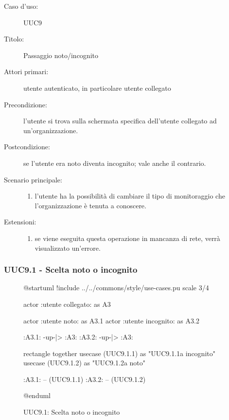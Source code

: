 \documentclass[casi-duso]{subfiles}
\begin{document}
\begin{description}
  \item[Caso d’uso:] UUC9
  \item[Titolo:] Passaggio noto/incognito
  \item[Attori primari:] utente autenticato, in particolare utente collegato
  \item[Precondizione:] l'utente si trova sulla schermata specifica dell'utente collegato ad un'organizzazione.
  \item[Postcondizione:] se l'utente era noto diventa incognito; vale anche il contrario.
  \item[Scenario principale:]
        \begin{enumerate}
          \item l'utente ha la possibilità di cambiare il tipo di monitoraggio che l'organizzazione è tenuta a conoscere.
        \end{enumerate}
  \item[Estensioni:]
        \begin{enumerate}
          \item se viene eseguita questa operazione in mancanza di rete, verrà visualizzato un'errore.
        \end{enumerate}
\end{description}

\subsubsection{UUC9.1 - Scelta noto o incognito}%
\label{subsub:UUC9.1utente}

\begin{figure}[h!] 
  \centering 
  \begin{plantuml}
  @startuml
  !include ../../commons/style/use-cases.pu
  scale 3/4

  actor :utente collegato: as A3

  actor :utente noto: as A3.1
  actor :utente incognito: as A3.2

  :A3.1: -up-|> :A3:
  :A3.2: -up-|> :A3:

  rectangle {
    together {
      usecase (UUC9.1.1) as "UUC9.1.1\nPassaggio a incognito"
      usecase (UUC9.1.2) as "UUC9.1.2\nPassaggio a noto"
    }
  }

  :A3.1: -- (UUC9.1.1)
  :A3.2: -- (UUC9.1.2)

  @enduml
  \end{plantuml} 
  \caption{UUC9.1: Scelta noto o incognito} 
  \label{fig:uuc9_1} 
\end{figure}
\end{document}
